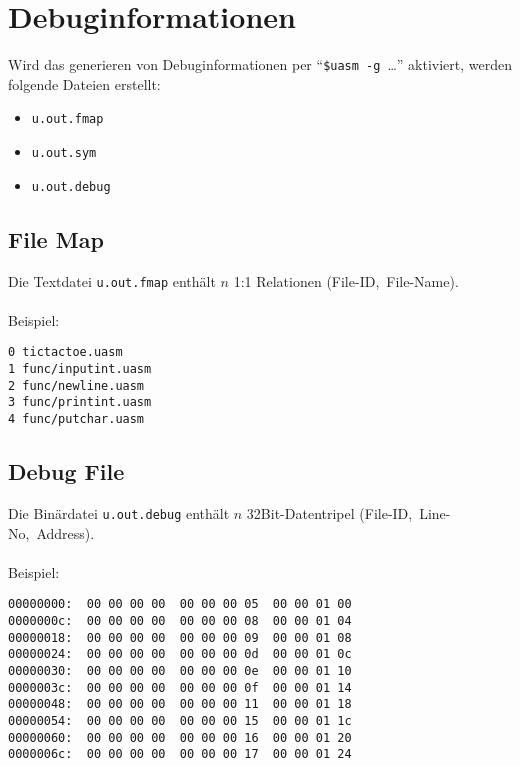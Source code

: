 \section{Debuginformationen}

\begin{frame}{\insertsection}
    Wird das generieren von Debuginformationen per ``\texttt{\$uasm~-g}~\ldots''
    aktiviert, werden folgende Dateien erstellt:
    \begin{itemize}
        \item \texttt{u.out.fmap}
        \item \texttt{u.out.sym}
        \item \texttt{u.out.debug}
    \end{itemize}
\end{frame}

\subsection{File Map}

\begin{frame}[fragile]{\insertsubsection}
    Die Textdatei \texttt{u.out.fmap} enthält $n$ 1:1 Relationen (File-ID,~File-Name).
    \\~\\
    Beispiel:
\begin{verbatim}
0 tictactoe.uasm
1 func/inputint.uasm
2 func/newline.uasm
3 func/printint.uasm
4 func/putchar.uasm
\end{verbatim}
\end{frame}

\subsection{Debug File}

\begin{frame}[fragile]{\insertsubsection}
    Die Binärdatei \texttt{u.out.debug} enthält $n$ 32Bit-Datentripel
    (File-ID,~Line-No,~Address).
    \\~\\
    Beispiel:
\begin{verbatim}
00000000:  00 00 00 00  00 00 00 05  00 00 01 00
0000000c:  00 00 00 00  00 00 00 08  00 00 01 04
00000018:  00 00 00 00  00 00 00 09  00 00 01 08
00000024:  00 00 00 00  00 00 00 0d  00 00 01 0c
00000030:  00 00 00 00  00 00 00 0e  00 00 01 10
0000003c:  00 00 00 00  00 00 00 0f  00 00 01 14
00000048:  00 00 00 00  00 00 00 11  00 00 01 18
00000054:  00 00 00 00  00 00 00 15  00 00 01 1c
00000060:  00 00 00 00  00 00 00 16  00 00 01 20
0000006c:  00 00 00 00  00 00 00 17  00 00 01 24
\end{verbatim}
\end{frame}


